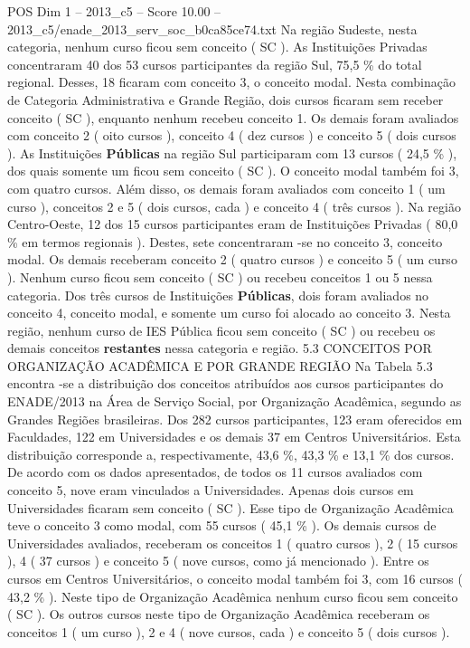 \begin{textsample}{POS Dim 1 – 2013\_c5 – Score 10.00 – 2013\_c5/enade\_2013\_serv\_soc\_b0ca85ce74.txt}
Na região Sudeste, nesta categoria, nenhum curso ficou sem conceito ( SC ).
As Instituições Privadas concentraram 40 dos 53 cursos participantes da região Sul, 75,5 \% do total regional.
Desses, 18 ficaram com conceito 3, o conceito modal.
Nesta combinação de Categoria Administrativa e Grande Região, dois cursos ficaram sem receber conceito ( SC ), enquanto nenhum recebeu conceito 1.
Os demais foram avaliados com conceito 2 ( oito cursos ), conceito 4 ( dez cursos ) e conceito 5 ( dois cursos ).
As Instituições \textbf{Públicas} na região Sul participaram com 13 cursos ( 24,5 \% ), dos quais somente um ficou sem conceito ( SC ).
O conceito modal também foi 3, com quatro cursos.
Além disso, os demais foram avaliados com conceito 1 ( um curso ), conceitos 2 e 5 ( dois cursos, cada ) e conceito 4 ( três cursos ).
Na região Centro-Oeste, 12 dos 15 cursos participantes eram de Instituições Privadas ( 80,0 \% em termos regionais ).
Destes, sete concentraram -se no conceito 3, conceito modal.
Os demais receberam conceito 2 ( quatro cursos ) e conceito 5 ( um curso ).
Nenhum curso ficou sem conceito ( SC ) ou recebeu conceitos 1 ou 5 nessa categoria.
Dos três cursos de Instituições \textbf{Públicas}, dois foram avaliados no conceito 4, conceito modal, e somente um curso foi alocado ao conceito 3.
Nesta região, nenhum curso de IES Pública ficou sem conceito ( SC ) ou recebeu os demais conceitos \textbf{restantes} nessa categoria e região. 5.3 CONCEITOS POR ORGANIZAÇÃO ACADÊMICA E POR GRANDE REGIÃO Na Tabela 5.3 encontra -se a distribuição dos conceitos atribuídos aos cursos participantes do ENADE/2013 na Área de Serviço Social, por Organização Acadêmica, segundo as Grandes Regiões brasileiras.
Dos 282 cursos participantes, 123 eram oferecidos em Faculdades, 122 em Universidades e os demais 37 em Centros Universitários.
Esta distribuição corresponde a, respectivamente, 43,6 \%, 43,3 \% e 13,1 \% dos cursos.
De acordo com os dados apresentados, de todos os 11 cursos avaliados com conceito 5, nove eram vinculados a Universidades.
Apenas dois cursos em Universidades ficaram sem conceito ( SC ).
Esse tipo de Organização Acadêmica teve o conceito 3 como modal, com 55 cursos ( 45,1 \% ).
Os demais cursos de Universidades avaliados, receberam os conceitos 1 ( quatro cursos ), 2 ( 15 cursos ), 4 ( 37 cursos ) e conceito 5 ( nove cursos, como já mencionado ).
Entre os cursos em Centros Universitários, o conceito modal também foi 3, com 16 cursos ( 43,2 \% ).
Neste tipo de Organização Acadêmica nenhum curso ficou sem conceito ( SC ).
Os outros cursos neste tipo de Organização Acadêmica receberam os conceitos 1 ( um curso ), 2 e 4 ( nove cursos, cada ) e conceito 5 ( dois cursos ).

\end{textsample}
